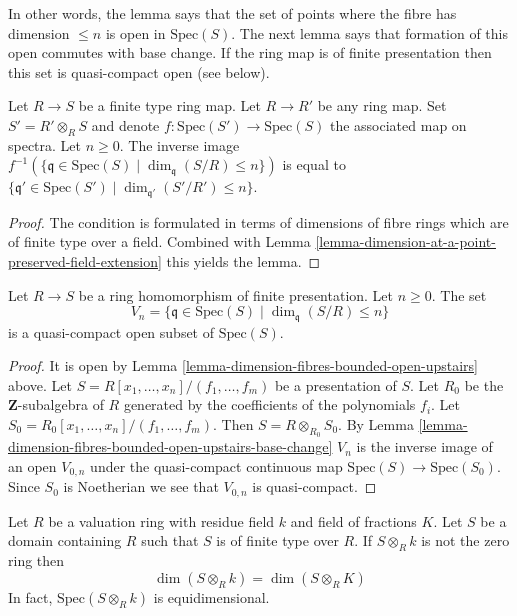 \noindent
In other words, the lemma says that the set of points where the
fibre has dimension $\leq n$ is open in $\text{Spec}(S)$.
The next lemma says that formation of this open commutes with
base change.
If the ring map is of finite presentation then this set is
quasi-compact open (see below).

\begin{lemma}
\label{lemma-dimension-fibres-bounded-open-upstairs-base-change}
Let $R \to S$ be a finite type ring map.
Let $R \to R'$ be any ring map.
Set $S' = R' \otimes_R S$ and denote $f : \text{Spec}(S') \to \text{Spec}(S)$ 
the associated map on spectra.
Let $n \geq 0$.
The inverse image
$f^{-1}(\{\mathfrak q \in \text{Spec}(S) \mid
\dim_{\mathfrak q}(S/R) \leq n\})$
is equal to
$\{\mathfrak q' \in \text{Spec}(S') \mid
\dim_{\mathfrak q'}(S'/R') \leq n\}$.
\end{lemma}

\begin{proof}
The condition is formulated in terms of dimensions
of fibre rings which are of finite type over a field.
Combined with
Lemma \ref{lemma-dimension-at-a-point-preserved-field-extension}
this yields the lemma.
\end{proof}

\begin{lemma}
\label{lemma-dimension-fibres-bounded-quasi-compact-open-upstairs}
Let $R \to S$ be a ring homomorphism of finite presentation.
Let $n \geq 0$. The set
$$
V_n = \{\mathfrak q \in \text{Spec}(S) \mid \dim_{\mathfrak q}(S/R) \leq n\}
$$
is a quasi-compact open subset of $\text{Spec}(S)$.
\end{lemma}

\begin{proof}
It is open by Lemma \ref{lemma-dimension-fibres-bounded-open-upstairs} above.
Let $S = R[x_1, \ldots, x_n]/(f_1, \ldots, f_m)$ be a presentation of
$S$. Let $R_0$ be the $\mathbf{Z}$-subalgebra of $R$ generated by the
coefficients of the polynomials $f_i$.
Let $S_0 = R_0[x_1, \ldots, x_n]/(f_1, \ldots, f_m)$.
Then $S = R \otimes_{R_0} S_0$. By
Lemma \ref{lemma-dimension-fibres-bounded-open-upstairs-base-change}
$V_n$ is the inverse image of an open $V_{0, n}$ under the quasi-compact
continuous map $\text{Spec}(S) \to \text{Spec}(S_0)$. Since
$S_0$ is Noetherian we see that $V_{0, n}$ is quasi-compact.
\end{proof}

\begin{lemma}
\label{lemma-finite-type-domain-over-valuation-ring-dim-fibres}
Let $R$ be a valuation ring with residue field $k$ and field
of fractions $K$. Let $S$ be a domain containing $R$ such that
$S$ is of finite type over $R$. If $S \otimes_R k$ is not the
zero ring then
$$
\dim(S \otimes_R k) = \dim(S \otimes_R K)
$$
In fact, $\text{Spec}(S \otimes_R k)$ is equidimensional.
\end{lemma}

